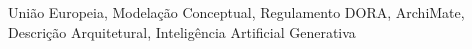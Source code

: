 \acresetall
\noindent União Europeia, Modelação Conceptual, Regulamento DORA, ArchiMate, Descrição Arquitetural, Inteligência Artificial Generativa
